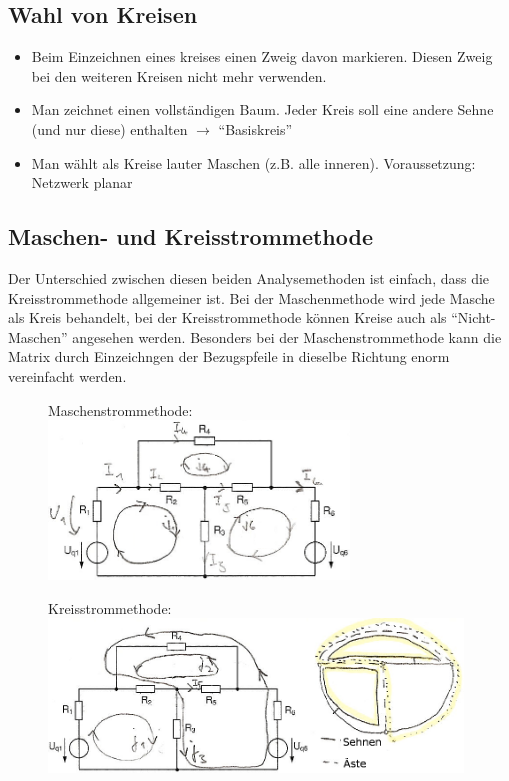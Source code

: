 \subsection{Wahl von Kreisen}
\begin{itemize}
\item Beim Einzeichnen eines kreises einen Zweig davon markieren. Diesen Zweig bei den weiteren Kreisen nicht mehr verwenden.
\item Man zeichnet einen vollständigen Baum. Jeder Kreis soll eine andere Sehne (und nur diese) enthalten $\rightarrow$ "`Basiskreis"'
\item Man wählt als Kreise lauter Maschen (z.B. alle inneren). Voraussetzung: Netzwerk planar
\end{itemize}
\newpage
\subsection{Maschen- und Kreisstrommethode}
Der Unterschied zwischen diesen beiden Analysemethoden ist einfach, dass die Kreisstrommethode allgemeiner ist. Bei der Maschenmethode wird jede Masche als Kreis behandelt, bei der Kreisstrommethode können Kreise auch als "`Nicht-Maschen"' angesehen werden. Besonders bei der Maschenstrommethode kann die Matrix durch Einzeichngen der Bezugspfeile in dieselbe Richtung enorm vereinfacht werden.
\begin{figure}[ht]
  \begin{minipage}[t]{8 cm} %
	  \centering
	  Maschenstrommethode:\\
	  \includegraphics[width=8cm]{pics/dcnet/maschenmethode}
	 \end{minipage}
	 \begin{minipage}[t]{11 cm}
	  \centering
	  Kreisstrommethode:\\
	  \includegraphics[width=11cm]{pics/dcnet/kreisstrommethode} 
  \end{minipage}
\end{figure}

